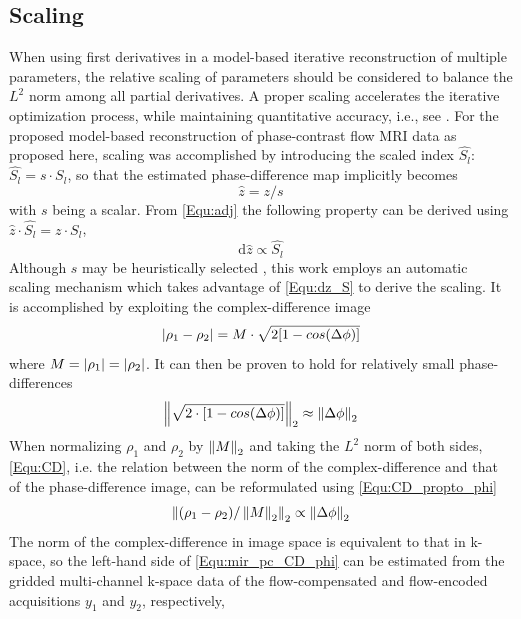 \subsection{Scaling}
When using first derivatives in a model-based iterative reconstruction of multiple parameters, the relative scaling of parameters should be considered to balance the $L^2$ norm among all partial derivatives. A proper scaling accelerates the iterative optimization process, while maintaining quantitative accuracy, i.e., see \cite{2009_MIR-T2_Block,2011_T2_Sumpf,2014_T2_Sumpf}. For the proposed model-based reconstruction of phase-contrast flow MRI data as proposed here, scaling was accomplished by introducing the scaled index $\hat{S_l}$: $\hat{S_l} = s \cdot S_l$, so that the estimated phase-difference map implicitly becomes 
\begin{equation} \label{Equ:zhat}
  \hat{z} = z / s
\end{equation}
with $s$ being a scalar. From \cref{Equ:adj} the following property can be derived using $\hat{z} \cdot \hat{S_l} = z \cdot S_l$,
\begin{equation} \label{Equ:dz_S}
  \text{d} \hat{z} \propto \hat{S_l}
\end{equation}
Although $s$ may be heuristically selected \cite{2009_MIR-T2_Block}, this work employs an automatic scaling mechanism which takes advantage of \cref{Equ:dz_S} to derive the scaling. It is accomplished by exploiting the complex-difference image \cite{2004_MRI_Bernstein}
\begin{equation} \label{Equ:CD}
  \lvert\rho_1 - \rho_2\rvert = M \cdot \sqrt{2[1-cos(\Delta \phi)]}
\end{equation}
where $M=\lvert\rho_1\rvert=\lvert\rho_2\rvert$. It can then be proven to hold for relatively small phase-differences
\begin{equation} \label{Equ:CD_propto_phi}
  \left\lVert\sqrt{2 \cdot [1-cos(\Delta \phi)]}\right\rVert_2 \approx \left\lVert\Delta \phi\right\rVert_2
\end{equation}
When normalizing $\rho_1$ and $\rho_2$ by $\left\lVert M\right\rVert_2$ and taking the $L^2$ norm of both sides, \cref{Equ:CD}, i.e. the relation between the norm of the complex-difference and that of the phase-difference image, can be reformulated using \cref{Equ:CD_propto_phi}
\begin{equation} \label{Equ:mir_pc_CD_phi}
  \left\lVert(\rho_1 - \rho_2)/\left\lVert M\right\rVert_2\right\rVert_2 \propto \left\lVert\Delta \phi\right\rVert_2
\end{equation}
The norm of the complex-difference in image space is equivalent to that in k-space, so the left-hand side of \cref{Equ:mir_pc_CD_phi} can be estimated from the gridded multi-channel k-space data of the flow-compensated and flow-encoded acquisitions $y_1$ and $y_2$, respectively, 
